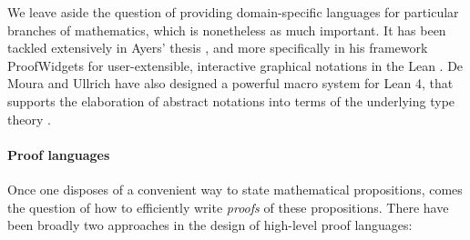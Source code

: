 We leave aside the question of providing domain-specific languages for
particular branches of mathematics, which is nonetheless as much important. It
has been tackled extensively in Ayers' thesis , and more
specifically in his framework ProofWidgets for user-extensible, interactive
graphical notations in the Lean  . De Moura and Ullrich
have also designed a powerful macro system for Lean 4, that supports the
elaboration of abstract notations into terms of the underlying type theory
.

\paragraph{Proof languages}

Once one disposes of a convenient way to state mathematical propositions, comes
the question of how to efficiently write \emph{proofs} of these propositions.
There have been broadly two approaches in the design of high-level proof
languages:

